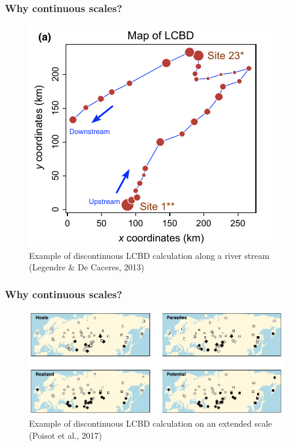 \documentclass[10pt]{beamer}
\begin{document}
\begin{frame}
  \frametitle{Why continuous scales?}
  \begin{figure}
    \centering
    \hspace*{-0cm}\includegraphics[scale=0.5]{fig/lcbd_LegeDeCa2013.png}
    \caption{Example of discontinuous LCBD calculation along a river stream (Legendre \& De Caceres, 2013)}
  \end{figure}
\end{frame}

\begin{frame}
  \frametitle{Why continuous scales?}
  \begin{figure}
    \centering
    \hspace*{-0cm}\includegraphics[scale=0.35]{fig/lcbd_Pois2017.png}
    \caption{Example of discontinuous LCBD calculation on an extended scale (Poisot et al., 2017)}
  \end{figure}
\end{frame}
\end{document}
